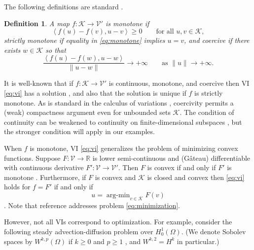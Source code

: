 \documentclass[letterpaper,final,12pt,reqno]{amsart}
\theoremstyle{cstyle}
\theoremstyle{dstyle}
\newtheorem{definition}[theorem]{Definition}
\numberwithin{equation}{section}
\numberwithin{figure}{section}
\numberwithin{table}{section}
\numberwithin{theorem}{section}
\newcommand{\RR}{\mathbb{R}}
\newcommand{\cK}{\mathcal{K}}
\newcommand{\cV}{\mathcal{V}}
\newcommand{\ip}[2]{\left<#1,#2\right>}
\begin{document}
The following definitions are standard \cite{KinderlehrerStampacchia1980}.

\begin{definition} A map $f:\cK \to \cV'$ is \emph{monotone} if
\begin{equation}
\ip{f(u)-f(v)}{u-v} \ge 0 \qquad \text{for all } u,v \in \cK, \label{eq:monotone}
\end{equation}
\emph{strictly monotone} if equality in \eqref{eq:monotone} implies $u=v$, and \emph{coercive} if there exists $w \in \cK$ so that
\begin{equation}
\frac{\ip{f(u)-f(w)}{u-w}}{\|u-w\|} \to +\infty \qquad \text{as } \|u\|\to +\infty. \label{eq:coercive}
\end{equation}
\end{definition}

It is well-known that if $f:\cK \to \cV'$ is continuous, monotone, and coercive then VI \eqref{eq:vi} has a solution \cite[Corollary III.1.8]{KinderlehrerStampacchia1980}, and also that the solution is unique if $f$ is strictly monotone.  As is standard in the calculus of variations \cite{Evans2010}, coercivity permits a (weak) compactness argument even for unbounded sets $\cK$.  The condition of continuity can be weakened to continuity on finite-dimensional subspaces \cite{KinderlehrerStampacchia1980}, but the stronger condition will apply in our examples.

When $f$ is monotone, VI \eqref{eq:vi} generalizes the problem of minimizing convex functions.  Suppose $F:\cV \to \RR$ is lower semi-continuous and (G\^ateau) differentiable with continuous derivative $F':\cV \to \cV'$.  Then $F$ is convex if and only if $F'$ is monotone \cite[Proposition I.5.5]{EkelandTemam1976}.  Furthermore, if $F$ is convex and $\cK$ is closed and convex then \eqref{eq:vi} holds for $f=F'$ if and only if
\begin{equation}
u = \operatorname{arg-min}_{v\in\cK} F(v) \label{eq:minimization}
\end{equation}
\cite[Proposition II.2.1]{EkelandTemam1976}.  Note that reference \cite{Tai2003} addresses problem \eqref{eq:minimization}.

However, not all VIs correspond to optimization.  For example, consider the following steady advection-diffusion problem over $H_0^1(\Omega)$.  (We denote Sobolev spaces by $W^{k,p}(\Omega)$ if $k\ge 0$ and $p\ge 1$ \cite{Evans2010}, and $W^{k,2}=H^k$ in particular.)
\end{document}

